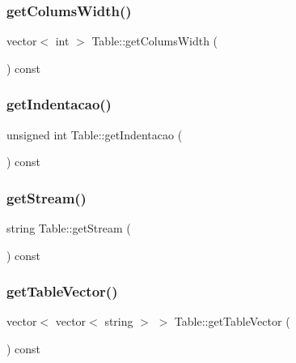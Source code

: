 \subsubsection{\texorpdfstring{get\+Colums\+Width()}{getColumsWidth()}}
{\footnotesize\ttfamily vector$<$ int $>$ Table\+::get\+Colums\+Width (\begin{DoxyParamCaption}{ }\end{DoxyParamCaption}) const}

\hypertarget{class_table_aa6fd97bbceb82d9acddf1858f3dbfc14}{}\label{class_table_aa6fd97bbceb82d9acddf1858f3dbfc14} 
\subsubsection{\texorpdfstring{get\+Indentacao()}{getIndentacao()}}
{\footnotesize\ttfamily unsigned int Table\+::get\+Indentacao (\begin{DoxyParamCaption}{ }\end{DoxyParamCaption}) const}

\hypertarget{class_table_a695b8d8f464194e26bcf23e07cd216bd}{}\label{class_table_a695b8d8f464194e26bcf23e07cd216bd} 
\subsubsection{\texorpdfstring{get\+Stream()}{getStream()}}
{\footnotesize\ttfamily string Table\+::get\+Stream (\begin{DoxyParamCaption}{ }\end{DoxyParamCaption}) const}

\hypertarget{class_table_a4a3ecdc1ad22d0dadd116af3cda3a74d}{}\label{class_table_a4a3ecdc1ad22d0dadd116af3cda3a74d} 
\subsubsection{\texorpdfstring{get\+Table\+Vector()}{getTableVector()}}
{\footnotesize\ttfamily vector$<$ vector$<$ string $>$ $>$ Table\+::get\+Table\+Vector (\begin{DoxyParamCaption}{ }\end{DoxyParamCaption}) const}



